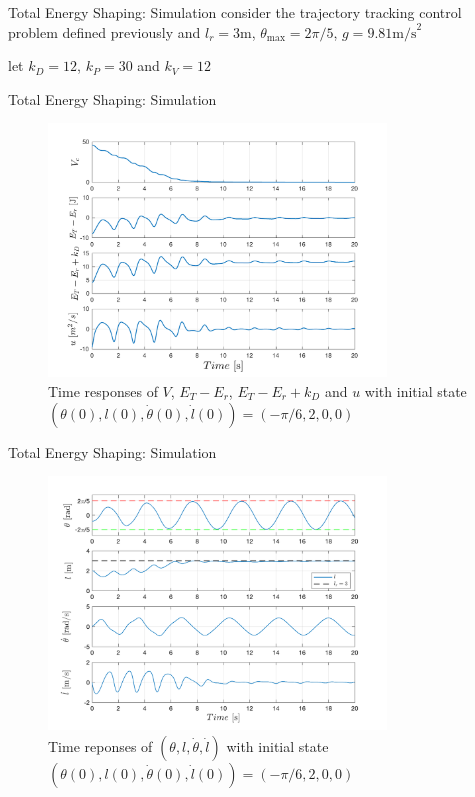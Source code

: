 \documentclass[10pt]{beamer}
\begin{document}
  \begin{frame}{Total Energy Shaping: Simulation}
    consider the trajectory tracking control problem defined previously
    and $l_r=3\text{m}$, $\theta_{\max}=2\pi/5$, $g=9.81\text{m/s}^2$
    
    \vspace{1cm}
    
    let $k_D=12$, $k_P=30$ and $k_V=12$
  \end{frame}

  \begin{frame}{Total Energy Shaping: Simulation}
    \begin{figure}
      \caption*{Time responses of $V$, $E_T-E_r$, $E_T-E_r+k_D$ and $u$
        with initial state
        $(\theta(0),l(0),\dot{\theta}(0),\dot{l}(0)) = (-\pi/6,2,0,0)$}
      \vspace{-0.3cm}
      \includegraphics[width=0.8\textwidth]{images/total_1b.pdf}
    \end{figure}
  \end{frame}

  \begin{frame}{Total Energy Shaping: Simulation}
    \begin{figure}
      \caption*{Time reponses of $(\theta,l,\dot{\theta},\dot{l})$ with initial
        state $(\theta(0),l(0),\dot{\theta}(0),\dot{l}(0))=(-\pi/6,2,0,0)$}
      \vspace{-0.3cm}
      \includegraphics[width=0.8\textwidth]{images/total_2b.pdf}
    \end{figure}
  \end{frame}
\end{document}
